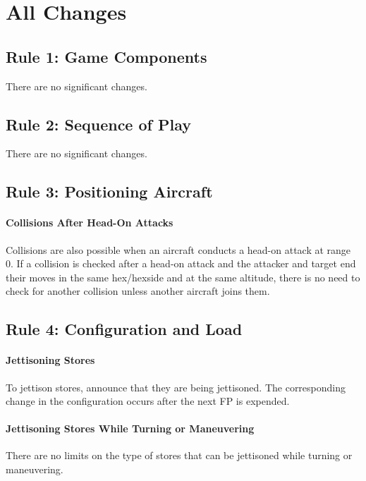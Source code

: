 \documentclass[10pt]{article}
\begin{document}
\section{All Changes}

\subsection{Rule 1: Game Components}

There are no significant changes.

\subsection{Rule 2: Sequence of Play}

There are no significant changes.

\subsection{Rule 3: Positioning Aircraft}

\paragraph{Collisions After Head-On Attacks} Collisions are also possible when an aircraft conducts a head-on attack at range 0. If a collision is checked after a head-on attack and the attacker and target end their moves in the same hex/hexside and at the same altitude, there is no need to check for another collision unless another aircraft joins them.

\subsection{Rule 4: Configuration and Load}

\paragraph{Jettisoning Stores} To jettison stores, announce that they are being jettisoned. The corresponding change in the configuration occurs after the next FP is expended. 

\paragraph{Jettisoning Stores While Turning or Maneuvering} There are no limits on the type of stores that can be jettisoned while turning or maneuvering.
\end{document}
